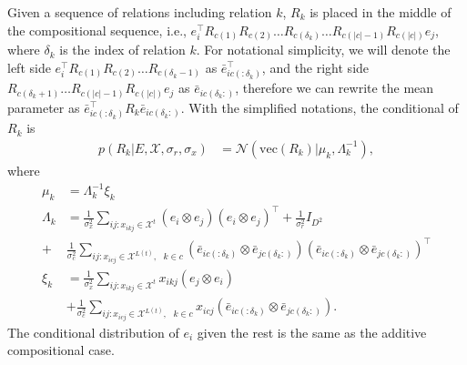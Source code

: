 Given a sequence of relations including relation $k$, $R_k$ is placed in the middle of the compositional
sequence, i.e., $e_i^\top R_{c(1)}R_{c(2)} \dots R_{c(\delta_k)} \dots R_{c(|c|-1)}R_{c(|c|)} e_j$, where $
\delta_k$ is the index of relation $k$. For notational simplicity, we will denote the left side $e_i^\top R_{c(1)}
R_{c(2)} \dots R_{c(\delta_k -1)}$ as $\bar{e}_{ic(:\delta_k)}^\top$, and the right side $R_{c(\delta_k + 1)} \dots
R_{c(|c|-1)}R_{c(|c|)} e_j$ as $\bar{e}_{ic(\delta_k:)}$, therefore we can rewrite the mean parameter as $
\bar{e}_{ic(:\delta_k)}^\top R_{k} \bar{e}_{ic(\delta_k:)}$. With the simplified notations, the conditional of $R_k$
is
\begin{align}
p(R_k|E, \mathcal{X}, \sigma_r, \sigma_x)  &= \mathcal{N}(\text{vec}(R_k) | \mu_k, \Lambda_k^{-1}),
\end{align}
where
\begin{align*}
\mu_k &= \Lambda_k^{-1}\xi_k \\
\Lambda_k &= \frac{1}{\sigma_x^2} \sum_{ij:x_{ikj} \in \mathcal{X}^{t}} (e_i \otimes e_j)(e_i \otimes e_j)^\top +
\frac{1}{\sigma_r^2} {I}_{D^2} \\
+ &\frac{1}{\sigma_c^2} \sum_{ij:x_{icj} \in \mathcal{X}^{L(t)}, \text{ }k \in c} (\bar{e}_{ic(:\delta_k)} \otimes
\bar{e}_{jc(\delta_k:)})(\bar{e}_{ic(:\delta_k)} \otimes \bar{e}_{jc(\delta_k:)} )^\top \\
\xi_k &= \frac{1}{\sigma_x^2} \sum_{ij:x_{ikj} \in \mathcal{X}^{t}} x_{ikj} (e_{j} \otimes e_{i}) \\
& + \frac{1}{\sigma_c^2} \sum_{ij:x_{icj} \in \mathcal{X}^{L(t)}, \text{ }k\in c} x_{icj} (\bar{e}_{ic(:\delta_k)}
\otimes \bar{e}_{jc(\delta_k:)}).
\end{align*}
The conditional distribution of $e_i$ given the rest is the same as the additive compositional case.

